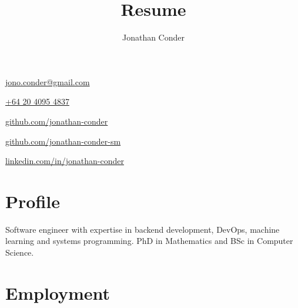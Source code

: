 \documentclass[10pt]{article}
\title{Resume}
\author{Jonathan Conder}
\makeatletter
\newcommand\theemail{jono.conder@gmail.com}
\newcommand\thenumber{+64 20 4095 4837}
\newcommand\thegithub{github.com/jonathan-conder}
\newcommand\thegithubsm{github.com/jonathan-conder-sm}
\newcommand\thelinkedin{linkedin.com/in/jonathan-conder}
\edef\thenumberplain{\thestring}
\makeatother
\begin{document}
\begin{minipage}[t]{0.5\textwidth}
	\begin{iconize}
	\item[\faUser]
		\theauthor
	\item[\faEnvelope]
		\href{mailto:\theemail}{\theemail}
	\item[\faPhone]
		\href{tel:\thenumberplain}{\thenumber}
	\end{iconize}
\end{minipage}
\begin{minipage}[t]{0.5\textwidth}
	\begin{iconize}
	\item[\faGithub]
		\href{https://\thegithub}{\thegithub}
	\item[\faGithub]
		\href{https://\thegithubsm}{\thegithubsm}
	\item[\faLinkedin]
		\href{https://www.\thelinkedin}{\thelinkedin}
	\end{iconize}
\end{minipage}

\section{Profile}

Software engineer with expertise in backend development, DevOps, machine learning and systems programming.
PhD in Mathematics and BSc in Computer Science.

\section{Employment}
\end{document}
